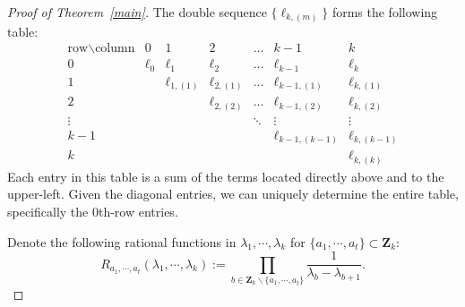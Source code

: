\documentclass[a4paper]{article}
\theoremstyle{plain}
\theoremstyle{definition}
\begin{document}
\begin{proof}[Proof of Theorem~\ref{main}]
	The double sequence $\{\ell_{k,(m)}\}$ forms the following table:
	\begin{equation} \label{table}
		\begin{array}{c|cccccc}
			\text{row}\backslash\text{column} & 0 & 1 & 2 & \dots & k-1 & k \\
			\hline
			0 & \ell_0 & \ell_1 & \ell_2 & \dots & \ell_{k-1} & \ell_k \\
			1 & & \ell_{1,(1)} & \ell_{2,(1)} & \dots & \ell_{k-1,(1)} & \ell_{k,(1)} \\
			2 & & & \ell_{2,(2)} & \dots & \ell_{k-1,(2)} & \ell_{k,(2)} \\
			\vdots & & & & \ddots & \vdots & \vdots \\
			k-1 & & & & & \ell_{k-1,(k-1)} & \ell_{k,(k-1)} \\
			k & & & & & & \ell_{k,(k)}
		\end{array}
	\end{equation} 
	Each entry in this table is a sum of the terms located directly above and to the upper-left. Given the diagonal entries, we can uniquely determine the entire table, specifically the 0th-row entries.

Denote the following rational functions in $\lambda_1,\cdots,\lambda_k$ for $\{a_1,\cdots,a_t\}\subset \mathbf Z_k$:
\begin{equation}
	R_{a_1,\cdots,a_t}(\lambda_1,\cdots,\lambda_k):=\prod_{b\in \mathbf Z_k\backslash\{a_1,\cdots,a_t\}}\frac{1}{\lambda_b-\lambda_{b+1}}.
\end{equation}


\end{proof}
\end{document}
